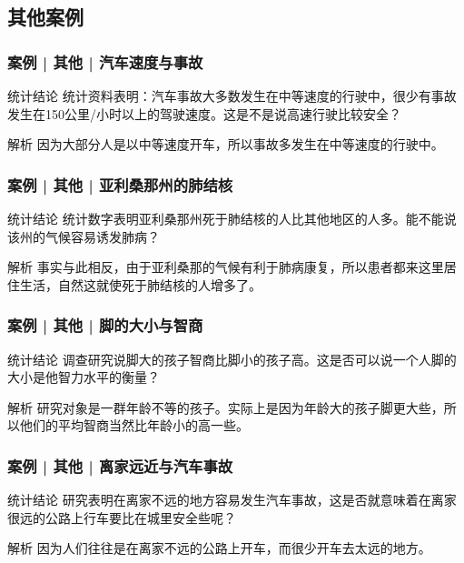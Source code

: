 \subsection{其他案例}
\begin{frame}
  \frametitle{案例 | 其他 | 汽车速度与事故}
  \begin{block}{统计结论}
    统计资料表明：汽车事故大多数发生在中等速度的行驶中，很少有事故发生在150公里/小时以上的驾驶速度。这是不是说高速行驶比较安全？
  \end{block}
  \pause
  \begin{block}{解析}
    因为大部分人是以中等速度开车，所以事故多发生在中等速度的行驶中。
  \end{block}
\end{frame}

\begin{frame}
  \frametitle{案例 | 其他 | 亚利桑那州的肺结核}
  \begin{block}{统计结论}
    统计数字表明亚利桑那州死于肺结核的人比其他地区的人多。能不能说该州的气候容易诱发肺病？
  \end{block}
  \pause
  \begin{block}{解析}
    事实与此相反，由于亚利桑那的气候有利于肺病康复，所以患者都来这里居住生活，自然这就使死于肺结核的人增多了。
  \end{block}
\end{frame}

\begin{frame}
  \frametitle{案例 | 其他 | 脚的大小与智商}
  \begin{block}{统计结论}
    调查研究说脚大的孩子智商比脚小的孩子高。这是否可以说一个人脚的大小是他智力水平的衡量？
  \end{block}
  \pause
  \begin{block}{解析}
    研究对象是一群年龄不等的孩子。实际上是因为年龄大的孩子脚更大些，所以他们的平均智商当然比年龄小的高一些。
  \end{block}
\end{frame}

\begin{frame}
  \frametitle{案例 | 其他 | 离家远近与汽车事故}
  \begin{block}{统计结论}
    研究表明在离家不远的地方容易发生汽车事故，这是否就意味着在离家很远的公路上行车要比在城里安全些呢？
  \end{block}
  \pause
  \begin{block}{解析}
    因为人们往往是在离家不远的公路上开车，而很少开车去太远的地方。
  \end{block}
\end{frame}

